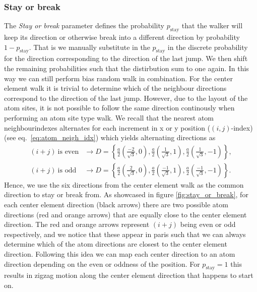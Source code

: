 \begin{figure}[H]
     \label{fig:bias_prob}
\end{figure}


\subsubsection{Stay or break}
The \textit{Stay or break} parameter defines the probability $p_{\text{stay}}$ that the walker will keep its direction or otherwise break into a different direction by probability $1-p_{\text{stay}}$. That is we manually substitute in the $p_{\text{stay}}$ in the discrete probability for the direction corresponding to the direction of the last jump. We then shift the remaining probabilities such that the distirbution sum to one again. In this way we can still perform bias random walk in combination. For the center element walk it is trivial to determine which of the neighbour directions correspond to the direction of the last jump. However, due to the layout of the atom sites, it is not possible to follow the same direction continously when performing an atom site type walk. We recall that the nearest atom neighbourindexes alternates for each increment in x or y position ($(i, j)$-index) (see eq.~\eqref{eq:atom_neigh_idx}) which yields alternating directions as
\begin{align*}
  (i + j) \ \text{is even} &\rightarrow D = \left\{ \frac{a}{2}\left(\frac{-2}{\sqrt{3}}, 0\right), \frac{a}{2}\left(\frac{1}{\sqrt{3}}, 1\right), \frac{a}{2}\left(\frac{1}{\sqrt{3}}, -1\right)\right\}, \\
  (i + j) \ \text{is odd} &\rightarrow D = \left\{ \frac{a}{2}\left(\frac{2}{\sqrt{3}}, 0\right), \frac{a}{2}\left(\frac{-1}{\sqrt{3}}, 1\right), \frac{a}{2}\left(\frac{-1}{\sqrt{3}}, -1\right)\right\}.
\end{align*}
Hence, we use the six directions from the center element walk as the common direction to stay or break from. As showcased in figure \ref{fig:stay_or_break}, for each center element direction (black arrows) there are two possible atom directions (red and orange arrows) that are equally close to the center element direction. The red and orange arrows represent $(i+j)$ being even or odd respectively, and we notice that these appear in paris such that we can always determine which of the atom directions are closest to the center element direction. Following this idea we can map each center direction to an atom direction depending on the even or oddness of the position. For $p_{\text{stay}} = 1$ this results in zigzag motion along the center element direction that happens to start on. 

